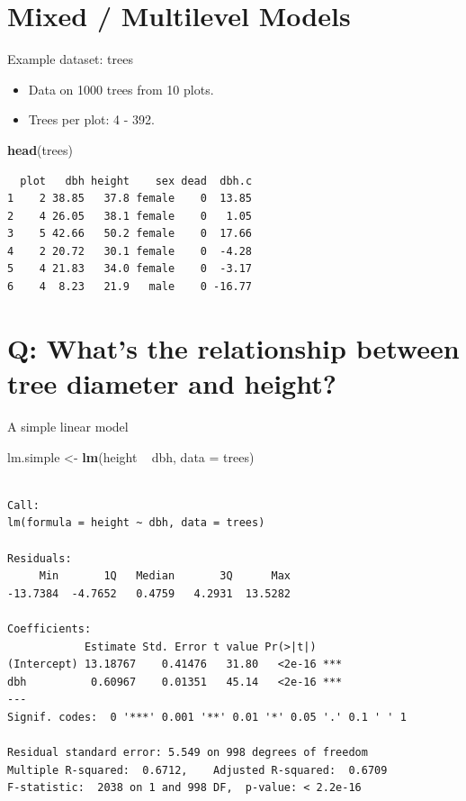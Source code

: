 \documentclass[10pt,ignorenonframetext,]{beamer}
\newenvironment{Shaded}{\begin{snugshade}}{\end{snugshade}}
\newcommand{\KeywordTok}[1]{\textcolor[rgb]{0.13,0.29,0.53}{\textbf{{#1}}}}
\newcommand{\DataTypeTok}[1]{\textcolor[rgb]{0.13,0.29,0.53}{{#1}}}
\newcommand{\StringTok}[1]{\textcolor[rgb]{0.31,0.60,0.02}{{#1}}}
\newcommand{\NormalTok}[1]{{#1}}
\begin{document}
\section{Mixed / Multilevel Models}\label{mixed-multilevel-models}

\begin{frame}[fragile]{Example dataset: trees}

\begin{itemize}[<+->]
\item
  Data on 1000 trees from 10 plots.
\item
  Trees per plot: 4 - 392.
\end{itemize}

\begin{Shaded}
\begin{Highlighting}[]
\KeywordTok{head}\NormalTok{(trees)}
\end{Highlighting}
\end{Shaded}

\begin{verbatim}
  plot   dbh height    sex dead  dbh.c
1    2 38.85   37.8 female    0  13.85
2    4 26.05   38.1 female    0   1.05
3    5 42.66   50.2 female    0  17.66
4    2 20.72   30.1 female    0  -4.28
5    4 21.83   34.0 female    0  -3.17
6    4  8.23   21.9   male    0 -16.77
\end{verbatim}

\end{frame}

\section{Q: What's the relationship between tree diameter and
height?}\label{q-whats-the-relationship-between-tree-diameter-and-height}

\begin{frame}[fragile]{A simple linear model}

\begin{Shaded}
\begin{Highlighting}[]
\NormalTok{lm.simple <-}\StringTok{ }\KeywordTok{lm}\NormalTok{(height ~}\StringTok{ }\NormalTok{dbh, }\DataTypeTok{data =} \NormalTok{trees)}
\end{Highlighting}
\end{Shaded}

\begin{verbatim}

Call:
lm(formula = height ~ dbh, data = trees)

Residuals:
     Min       1Q   Median       3Q      Max 
-13.7384  -4.7652   0.4759   4.2931  13.5282 

Coefficients:
            Estimate Std. Error t value Pr(>|t|)    
(Intercept) 13.18767    0.41476   31.80   <2e-16 ***
dbh          0.60967    0.01351   45.14   <2e-16 ***
---
Signif. codes:  0 '***' 0.001 '**' 0.01 '*' 0.05 '.' 0.1 ' ' 1

Residual standard error: 5.549 on 998 degrees of freedom
Multiple R-squared:  0.6712,    Adjusted R-squared:  0.6709 
F-statistic:  2038 on 1 and 998 DF,  p-value: < 2.2e-16
\end{verbatim}

\end{frame}
\end{document}
